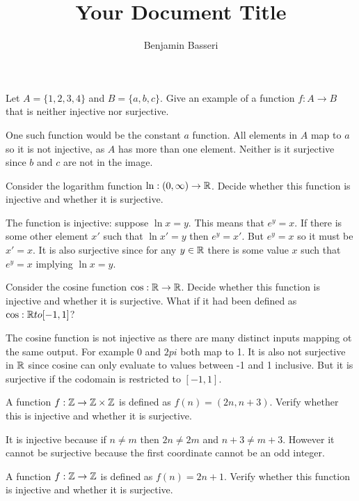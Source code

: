 \documentclass{article}
\title{Your Document Title}
\author{Benjamin Basseri}
\begin{document}
\maketitle

\begin{problem}
Let $A = \{1, 2, 3, 4\}$ and $B = \{a, b, c\}$. Give an example of a function $f: A \to B$ that is neither injective nor surjective.
\end{problem}

One such function would be the constant $a$ function. All elements in $A$ map to $a$ so it is not injective, as $A$ has more than one element. Neither is it surjective since $b$ and $c$ are not in the image.

\begin{problem}
Consider the logarithm function $\ln : (0, \infty) \to \mathbb{R}$. Decide whether this function is injective and whether it is surjective.
\end{problem}

The function is injective: suppose $\ln x = y$. This means that $e^y = x$. If there is some other element $x'$ such that $\ln x' = y$ then $e^y = x'$. But $e^y = x$ so it must be $x' = x$. It is also surjective since for any $y \in \mathbb{R}$ there is some value $x$ such that $e^y = x$ implying $\ln x = y$.

\begin{problem}
Consider the cosine function $\cos: \mathbb{R} \to \mathbb{R}$. Decide whether this function is injective and whether it is surjective. What if it had been defined as $\cos: \mathbb{R} to [-1, 1]$?
\end{problem}

The cosine function is not injective as there are many distinct inputs mapping ot the same output. For example 0 and $2pi$ both map to 1. It is also not surjective in $\mathbb{R}$ since cosine can only evaluate to values between -1 and 1 inclusive. But it is surjective if the codomain is restricted to $[-1, 1]$.

\begin{problem}
A function $f: \mathbb{Z} \to \mathbb{Z} \times \mathbb{Z}$ is defined as $f(n) = (2n, n + 3)$. Verify whether this is injective and whether it is surjective.
\end{problem}

It is injective because if $n \neq m$ then $2n \neq 2m$ and $n +3 \neq m + 3$. However it cannot be surjective because the first coordinate cannot be an odd integer.

\begin{problem}
A function $f: \mathbb{Z} \to \mathbb{Z}$ is defined as $f(n) = 2n + 1$. Verify whether this function is injective and whether it is surjective.
\end{problem}
\end{document}
